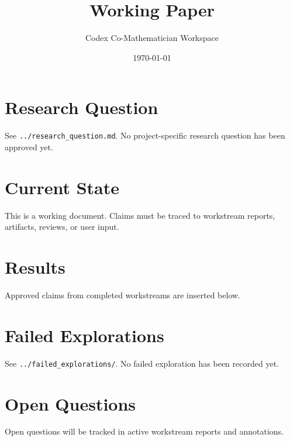 \documentclass[11pt]{article}
\title{Working Paper}
\author{Codex Co-Mathematician Workspace}
\date{\today}
\begin{document}
\maketitle

\section{Research Question}

See \texttt{../research\_question.md}. No project-specific research question has been approved yet.

\section{Current State}

This is a working document. Claims must be traced to workstream reports, artifacts, reviews, or user input.

\section{Results}

Approved claims from completed workstreams are inserted below.



\section{Failed Explorations}

See \texttt{../failed\_explorations/}. No failed exploration has been recorded yet.

\section{Open Questions}

Open questions will be tracked in active workstream reports and annotations.
\end{document}
